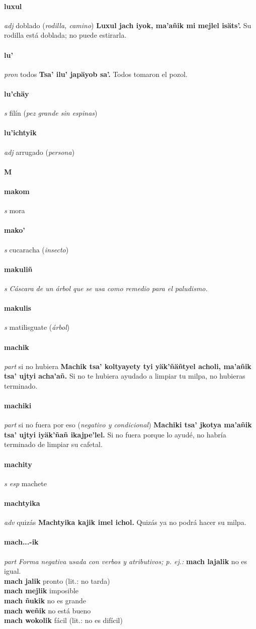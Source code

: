 \documentclass{scrbook}
\newcommand{\entry}[1]{\paragraph{#1}}
\newcommand{\alphaletter}[1]{\addsec{#1}}
\newcommand{\nontranslationdef}[1]{\textit{#1}}
\newcommand{\partofspeech}[1]{\textit{#1}}
\newcommand{\spanishtranslation}[1]{#1}
\newcommand{\clarification}[1]{(\textit{#1})}
\newcommand{\cholexample}[1]{\textbf{#1}}
\newcommand{\exampletranslation}[1]{#1}
\newcommand{\secondaryentry}[1]{\\\textbf{#1}}
\newcommand{\secondtranslation}[1]{#1}
\begin{document}
\begin{multicols}{2}
\entry{luxul}
\partofspeech{adj}
\spanishtranslation{doblado}
\clarification{rodilla, camino}
\cholexample{Luxul jach iyok, ma'añik mi mejlel isäts'.}
\exampletranslation{Su rodilla está doblada; no puede estirarla.}

\entry{lu'}
\partofspeech{pron}
\spanishtranslation{todos}
\cholexample{Tsa' ilu' japäyob sa'.}
\exampletranslation{Todos tomaron el pozol.}

\entry{lu'chäy}
\partofspeech{s}
\spanishtranslation{filín}
\clarification{pez grande sin espinas}

\entry{lu'ichtyik}
\partofspeech{adj}
\spanishtranslation{arrugado}
\clarification{persona}

\entry{M}
\alphaletter{M}

\entry{makom}
\partofspeech{s}
\spanishtranslation{mora}

\entry{mako'}
\partofspeech{s}
\spanishtranslation{cucaracha}
\clarification{insecto}

\entry{makuliñ}
\partofspeech{s}
\nontranslationdef{Cáscara de un árbol que se usa como remedio para el paludismo.}

\entry{makulis}
\partofspeech{s}
\spanishtranslation{matilisguate}
\clarification{árbol}

\entry{machik}
\partofspeech{part}
\spanishtranslation{si no hubiera}
\cholexample{Machik tsa' koltyayety tyi yäk'ñäñtyel acholi, ma'añik tsa' ujtyi acha'añ.}
\exampletranslation{Si no te hubiera ayudado a limpiar tu milpa, no hubieras terminado.}

\entry{machiki}
\partofspeech{part}
\spanishtranslation{si no fuera por eso}
\clarification{negativo y condicional}
\cholexample{Machiki tsa' jkotya ma'añik tsa' ujtyi iyäk'ñañ ikajpe'lel.}
\exampletranslation{Si no fuera porque lo ayudé, no habría terminado de limpiar su cafetal.}

\entry{machity}
\partofspeech{s esp}
\spanishtranslation{machete}

\entry{machtyika}
\partofspeech{adv}
\spanishtranslation{quizás}
\cholexample{Machtyika kajik imel ichol.}
\exampletranslation{Quizás ya no podrá hacer su milpa.}

\entry{mach...-ik}
\partofspeech{part}
\nontranslationdef{Forma negativa usada con verbos y atributivos; p. ej.:}
\cholexample{mach lajalik}
\exampletranslation{no es igual.}
\secondaryentry{mach jalik}
\secondtranslation{pronto (lit.: no tarda)}
\secondaryentry{mach mejlik}
\secondtranslation{imposible}
\secondaryentry{mach ñukik}
\secondtranslation{no es grande}
\secondaryentry{mach weñik}
\secondtranslation{no está bueno}
\secondaryentry{mach wokolik}
\secondtranslation{fácil (lit.: no es difícil)}


\end{multicols}
\end{document}
